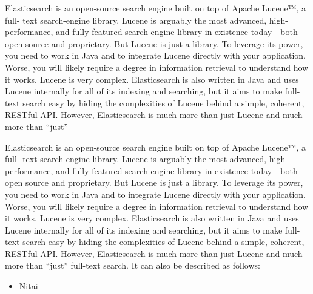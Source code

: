 Elasticsearch is an open-source search engine built on top of Apache Lucene™, a full-
text search-engine library. Lucene is arguably the most advanced, high-performance,
and fully featured search engine library in existence today—both open source and
proprietary.
But Lucene is just a library. To leverage its power, you need to work in Java and to
integrate Lucene directly with your application. Worse, you will likely require a
degree in information retrieval to understand how it works. Lucene is very complex.
Elasticsearch is also written in Java and uses Lucene internally for all of its indexing
and searching, but it aims to make full-text search easy by hiding the complexities of
Lucene behind a simple, coherent, RESTful API.
However, Elasticsearch is much more than just Lucene and much more than “just”

Elasticsearch is an open-source search engine built on top of Apache Lucene™, a full-
text search-engine library. Lucene is arguably the most advanced, high-performance,
and fully featured search engine library in existence today—both open source and
proprietary.
But Lucene is just a library. To leverage its power, you need to work in Java and to
integrate Lucene directly with your application. Worse, you will likely require a
degree in information retrieval to understand how it works. Lucene is very complex.
Elasticsearch is also written in Java and uses Lucene internally for all of its indexing
and searching, but it aims to make full-text search easy by hiding the complexities of
Lucene behind a simple, coherent, RESTful API.
However, Elasticsearch is much more than just Lucene and much more than “just”
full-text search. It can also be described as follows:
\begin{itemize}
	\item Nitai
\end{itemize}
